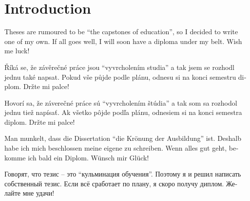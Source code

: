 \documentclass[
  digital,     %
  oneside,     %
  nosansbold,  %
  nocolorbold, %
  lof,         %
  lot,         %
]{fithesis4}
\begin{document}
\chapter*{Introduction}

Theses are rumoured to be \enquote{the capstones of education}, so
I decided to write one of my own. If all goes well, I will soon
have a diploma under my belt. Wish me luck!

\begin{otherlanguage}{czech}
Říká se, že závěrečné práce jsou \enquote{vyvrcholením studia}
a tak jsem se rozhodl jednu také napsat. Pokud vše půjde podle
plánu, odnesu si na konci semestru diplom. Držte mi palce!
\end{otherlanguage}

\begin{otherlanguage}{slovak}
Hovorí sa, že záverečné práce sú \enquote{vyvrcholením štúdia}
a tak som sa rozhodol jednu tiež napísať. Ak všetko pôjde podľa
plánu, odnesiem si na konci semestra diplom. Držte mi palce!
\end{otherlanguage}

\begin{otherlanguage}{german}
Man munkelt, dass die Dissertation \enquote{die Krönung der
Ausbildung} ist. Deshalb habe ich mich beschlossen meine eigene
zu schreiben. Wenn alles gut geht, bekomme ich bald ein Diplom.
Wünsch mir Glück!
\end{otherlanguage}

\begin{otherlanguage}{russian}
Говорят, что тезис -- это \enquote{кульминация обучения}. Поэтому
я и решил написать собственный тезис. Если всё сработает по плану,
я скоро получу диплом. Желайте мне удачи!
\end{otherlanguage}
\end{document}
